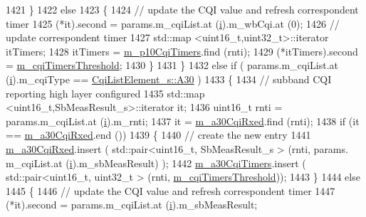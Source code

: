 \begin{DoxyCode}
1421             \}
1422           \textcolor{keywordflow}{else}
1423             \{
1424               \textcolor{comment}{// update the CQI value and refresh correspondent timer}
1425               (*it).second = params.m\_cqiList.at (\hyperlink{bernuolliDistribution_8m_a6f6ccfcf58b31cb6412107d9d5281426}{i}).m\_wbCqi.at (0);
1426               \textcolor{comment}{// update correspondent timer}
1427               std::map <uint16\_t,uint32\_t>::iterator itTimers;
1428               itTimers = \hyperlink{classns3_1_1TdTbfqFfMacScheduler_aaf5d854702133742423180538d27f6f1}{m\_p10CqiTimers}.find (rnti);
1429               (*itTimers).second = \hyperlink{classns3_1_1TdTbfqFfMacScheduler_a4a154b47a91bb301ab183ce57e44c431}{m\_cqiTimersThreshold};
1430             \}
1431         \}
1432       \textcolor{keywordflow}{else} \textcolor{keywordflow}{if} ( params.m\_cqiList.at (\hyperlink{bernuolliDistribution_8m_a6f6ccfcf58b31cb6412107d9d5281426}{i}).m\_cqiType == \hyperlink{structns3_1_1CqiListElement__s_a8f1bd827fd9842e7c07e39265d88299aab9a9d64494e36c89d7932a00edb056a7}{CqiListElement\_s::A30} )
1433         \{
1434           \textcolor{comment}{// subband CQI reporting high layer configured}
1435           std::map <uint16\_t,SbMeasResult\_s>::iterator it;
1436           uint16\_t rnti = params.m\_cqiList.at (\hyperlink{bernuolliDistribution_8m_a6f6ccfcf58b31cb6412107d9d5281426}{i}).m\_rnti;
1437           it = \hyperlink{classns3_1_1TdTbfqFfMacScheduler_a6523ed7737d8e753380a1207becdae8a}{m\_a30CqiRxed}.find (rnti);
1438           \textcolor{keywordflow}{if} (it == \hyperlink{classns3_1_1TdTbfqFfMacScheduler_a6523ed7737d8e753380a1207becdae8a}{m\_a30CqiRxed}.end ())
1439             \{
1440               \textcolor{comment}{// create the new entry}
1441               \hyperlink{classns3_1_1TdTbfqFfMacScheduler_a6523ed7737d8e753380a1207becdae8a}{m\_a30CqiRxed}.insert ( std::pair<uint16\_t, SbMeasResult\_s > (rnti, params.
      m\_cqiList.at (\hyperlink{bernuolliDistribution_8m_a6f6ccfcf58b31cb6412107d9d5281426}{i}).m\_sbMeasResult) );
1442               \hyperlink{classns3_1_1TdTbfqFfMacScheduler_a208160933cb6d934c6cfb8114734226a}{m\_a30CqiTimers}.insert ( std::pair<uint16\_t, uint32\_t > (rnti, 
      \hyperlink{classns3_1_1TdTbfqFfMacScheduler_a4a154b47a91bb301ab183ce57e44c431}{m\_cqiTimersThreshold}));
1443             \}
1444           \textcolor{keywordflow}{else}
1445             \{
1446               \textcolor{comment}{// update the CQI value and refresh correspondent timer}
1447               (*it).second = params.m\_cqiList.at (\hyperlink{bernuolliDistribution_8m_a6f6ccfcf58b31cb6412107d9d5281426}{i}).m\_sbMeasResult;

\end{DoxyCode}
